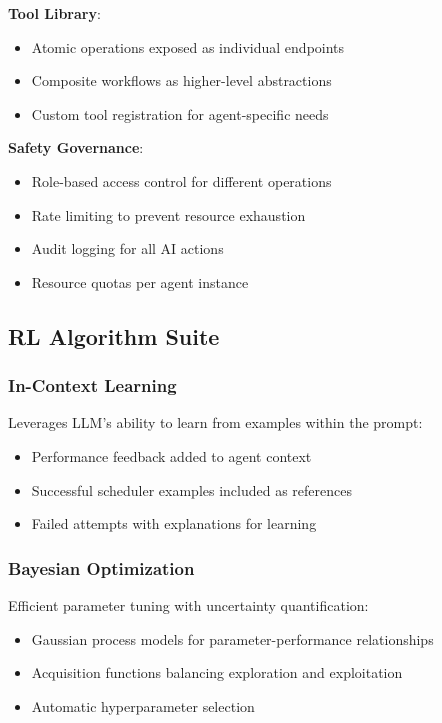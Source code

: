 \textbf{Tool Library}:
\begin{itemize}
\item Atomic operations exposed as individual endpoints
\item Composite workflows as higher-level abstractions
\item Custom tool registration for agent-specific needs
\end{itemize}

\textbf{Safety Governance}:
\begin{itemize}
\item Role-based access control for different operations
\item Rate limiting to prevent resource exhaustion
\item Audit logging for all AI actions
\item Resource quotas per agent instance
\end{itemize}

\subsection{RL Algorithm Suite}

\subsubsection{In-Context Learning}
Leverages LLM's ability to learn from examples within the prompt:
\begin{itemize}
\item Performance feedback added to agent context
\item Successful scheduler examples included as references
\item Failed attempts with explanations for learning
\end{itemize}

\subsubsection{Bayesian Optimization}
Efficient parameter tuning with uncertainty quantification:
\begin{itemize}
\item Gaussian process models for parameter-performance relationships
\item Acquisition functions balancing exploration and exploitation
\item Automatic hyperparameter selection
\end{itemize}

